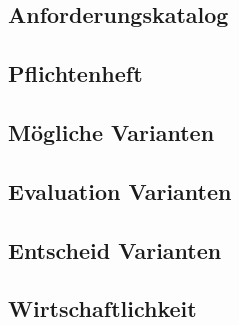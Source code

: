 \subsection{Anforderungskatalog}

\subsection{Pflichtenheft}

\subsection{Mögliche Varianten}

\subsection{Evaluation Varianten}

\subsection{Entscheid Varianten}

\subsection{Wirtschaftlichkeit}
